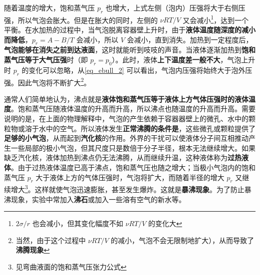 随着温度的增大，饱和蒸气压 $p_r$ 也增大，上式左侧（泡内）压强将大于右侧压强，所以气泡会胀大。但是在胀大的同时，左侧的 $\nu RT/V$ 又会减小\footnote{$2\sigma/r$ 也会减小，但其变化幅度不如 $\nu RT/V$ 的变化大}，达到一个平衡。在水加热的过程中，当气泡脱离容器壁上升时，由于\textbf{液体温度随深度的减小而降低}，$p_r=A-B/T$ 会减小，所以 $V$ 会减小，直到消失。加热到一定程度后，\textbf{气泡能够在消失之前到达液面}，这时就能听到吱吱的声音。当液体逐渐加热到\textbf{饱和蒸气压等于大气压强}时（即 $p_r=p_0$）。此时，液体\textbf{上下温度差一般不大}，气泡上升时 $p_r$ 的变化可以忽略，从\autoref{eq_ebull_2} 可以看出，气泡内压强将始终大于泡外压强。因此气泡将不断扩大\footnote{当然，由于这个过程中 $\nu RT/V$ 的减小，气泡不会无限制地扩大），从而导致了\textbf{沸腾现象}}。

通常人们简单地认为，沸点就是\textbf{液体饱和蒸气压等于液体上方气体压强时的液体温度}。饱和蒸气压随液体温度的升高而升高，所以沸点也随温度的升高而升高。需要说明的是，在上面的物理解释中，气泡的产生依赖于容器器壁上的微孔、水中的颗粒物或溶于水中的空气。所以液体发生\textbf{正常沸腾的条件是}，这些微孔或颗粒提供了\textbf{足够的小气泡}，从而起到\textbf{汽化核}的作用。外界的干扰可以使液体分子间互相推动产生一些局部的极小气泡，但其尺度只是数倍于分子半径，根本无法继续增大。如果缺乏汽化核，液体加热到沸点仍无法沸腾，从而继续升温，这种液体称为\textbf{过热液体}。由于过热液体温度已高于沸点，饱和蒸气压也随之增大；当极小气泡内的饱和蒸气压 $p_r$ 大于液体上方的气体压强时，气泡将扩大，而随着半径的增大 $p_r$ 又继续增大\footnote{见弯曲液面的饱和蒸气压张力公式}。这样就使气泡迅速膨胀，甚至发生爆炸。这就是\textbf{暴沸现象}。为了防止暴沸现象，实验中常加入\textbf{沸石}或加入一些溶有空气的新水等。
